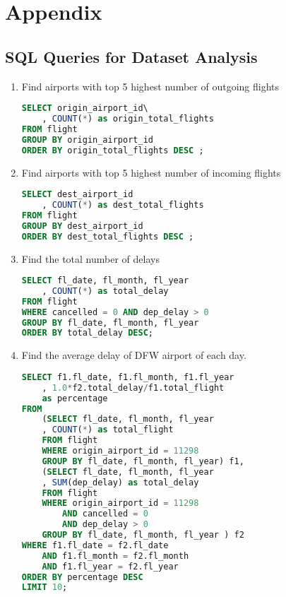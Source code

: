 \documentclass[11pt,a4paper]{article}
\begin{document}



\section*{Appendix}
\subsection*{SQL Queries for Dataset Analysis}
\begin{enumerate}
\item Find airports with top 5 highest number of outgoing flights
\begin{lstlisting}[frame=single, language=SQL]
SELECT origin_airport_id\
	, COUNT(*) as origin_total_flights
FROM flight
GROUP BY origin_airport_id
ORDER BY origin_total_flights DESC ;
\end{lstlisting}
\item Find airports with top 5 highest number of incoming flights
\begin{lstlisting}[frame=single, language=SQL]
SELECT dest_airport_id
	, COUNT(*) as dest_total_flights
FROM flight
GROUP BY dest_airport_id
ORDER BY dest_total_flights DESC ;
\end{lstlisting}
\item Find the total number of delays

\begin{lstlisting}[frame=single, language=SQL]
SELECT fl_date, fl_month, fl_year
	, COUNT(*) as total_delay
FROM flight
WHERE cancelled = 0 AND dep_delay > 0
GROUP BY fl_date, fl_month, fl_year
ORDER BY total_delay DESC;
\end{lstlisting}
\item Find the average delay of DFW airport of each day.
\begin{lstlisting}[frame=single, language=SQL]
SELECT f1.fl_date, f1.fl_month, f1.fl_year
	, 1.0*f2.total_delay/f1.total_flight 
	as percentage
FROM
	(SELECT fl_date, fl_month, fl_year
	, COUNT(*) as total_flight
	FROM flight
	WHERE origin_airport_id = 11298
	GROUP BY fl_date, fl_month, fl_year) f1,
	(SELECT fl_date, fl_month, fl_year
	, SUM(dep_delay) as total_delay
	FROM flight
	WHERE origin_airport_id = 11298
		AND cancelled = 0
		AND dep_delay > 0
	GROUP BY fl_date, fl_month, fl_year ) f2
WHERE f1.fl_date = f2.fl_date
	AND f1.fl_month = f2.fl_month
	AND f1.fl_year = f2.fl_year
ORDER BY percentage DESC
LIMIT 10;
\end{lstlisting}
\end{enumerate}
\end{document}
